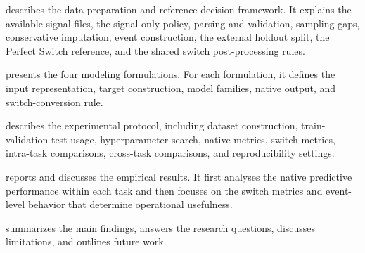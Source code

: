  describes the data preparation and
reference-decision framework. It explains the available signal files, the
signal-only policy, parsing and validation, sampling gaps, conservative
imputation, event construction, the external holdout split, the Perfect Switch
reference, and the shared switch post-processing rules.

 presents the four modeling formulations. For
each formulation, it defines the input representation, target construction,
model families, native output, and switch-conversion rule.

 describes the experimental protocol, including
dataset construction, train-validation-test usage, hyperparameter search,
native metrics, switch metrics, intra-task comparisons, cross-task
comparisons, and reproducibility settings.

 reports and discusses the empirical results. It first
analyses the native predictive performance within each task and then focuses
on the switch metrics and event-level behavior that determine operational
usefulness.

 summarizes the main findings, answers the research
questions, discusses limitations, and outlines future work.
